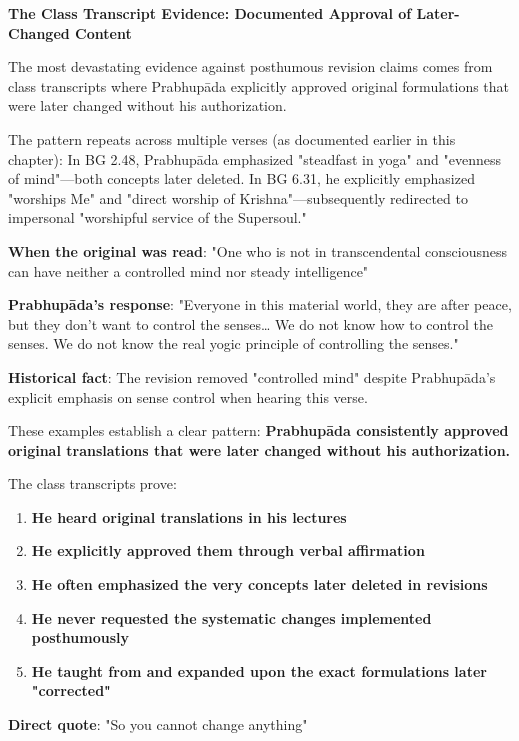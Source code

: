 \documentclass[12pt,twoside]{book}
\begin{document}
\vspace{0.5cm}
\textbf{The Class Transcript Evidence: Documented Approval of Later-Changed Content}
\vspace{0.2cm}


The most devastating evidence against posthumous revision claims comes from class transcripts where Prabhupāda explicitly approved original formulations that were later changed without his authorization.

The pattern repeats across multiple verses (as documented earlier in this chapter): In BG 2.48, Prabhupāda emphasized "steadfast in yoga" and "evenness of mind"—both concepts later deleted. In BG 6.31, he explicitly emphasized "worships Me" and "direct worship of Krishna"—subsequently redirected to impersonal "worshipful service of the Supersoul."

\textbf{\textbf{When the original was read}}: "One who is not in transcendental consciousness can have neither a controlled mind nor steady intelligence"

\textbf{\textbf{Prabhupāda's response}}: "Everyone in this material world, they are after peace, but they don't want to control the senses\ldots{} We do not know how to control the senses. We do not know the real yogic principle of controlling the senses."

\textbf{\textbf{Historical fact}}: The revision removed "controlled mind" despite Prabhupāda's explicit emphasis on sense control when hearing this verse.

These examples establish a clear pattern: \textbf{\textbf{Prabhupāda consistently approved original translations that were later changed without his authorization.}}

The class transcripts prove:
\begin{enumerate}
\item \textbf{\textbf{He heard original translations in his lectures}}
\item \textbf{\textbf{He explicitly approved them through verbal affirmation}}
\item \textbf{\textbf{He often emphasized the very concepts later deleted in revisions}}
\item \textbf{\textbf{He never requested the systematic changes implemented posthumously}}
\item \textbf{\textbf{He taught from and expanded upon the exact formulations later "corrected"}}
\end{enumerate}


\textbf{\textbf{Direct quote}}: "So you cannot change anything"
\end{document}
